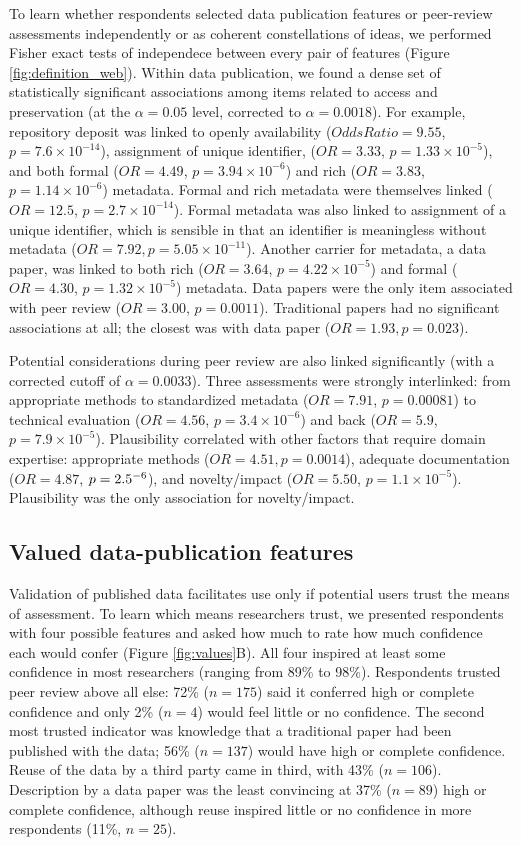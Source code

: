 \documentclass[10pt]{article}
\begin{document}
To learn whether respondents selected data publication features or peer-review assessments independently or as coherent constellations of ideas, we performed Fisher exact tests of independece between every pair of features (Figure \ref{fig:definition_web}).
Within data publication, we found a dense set of statistically significant associations among items related to access and preservation (at the $\alpha=0.05$ level, corrected to $\alpha=0.0018$).
For example, repository deposit was linked to openly availability ($Odds Ratio=9.55$, $p=7.6\times10^{-14}$), assignment of unique identifier, ($OR= 3.33$, $p= 1.33\times10^{-5}$), and both formal ($OR= 4.49$, $p= 3.94\times10^{-6}$) and rich ($OR= 3.83$, $p=1.14\times10^{-6}$) metadata.
Formal and rich metadata were themselves linked ($OR= 12.5$, $p=2.7\times10^{-14}$). 
Formal metadata was also linked to assignment of a unique identifier, which is sensible in that an identifier is meaningless without metadata ($OR= 7.92, p= 5.05\times10^{-11}$).
Another carrier for metadata, a data paper, was linked to both rich ($OR=3.64$, $p=4.22\times10^{-5}$) and formal ($OR=4.30$, $p=1.32\times10^{-5}$) metadata.
Data papers were the only item associated with peer review ($OR=3.00$, $p=0.0011$).
Traditional papers had no significant associations at all; the closest was with data paper ($OR=1.93, p=0.023$).

Potential considerations during peer review are also linked significantly (with a corrected cutoff of $\alpha=0.0033$).
Three assessments were strongly interlinked: from appropriate methods to standardized metadata ($OR=7.91$, $p=0.00081$) to technical evaluation ($OR=4.56$, $p=3.4\times10^{-6}$) and back ($OR=5.9$, $p=7.9\times10^{-5}$).
Plausibility correlated with other factors that require domain expertise: appropriate methods ($OR=4.51, p=0.0014$), adequate documentation ($OR=4.87$, $p=2.5\time10^{-6}$), and novelty/impact ($OR=5.50$, $p=1.1\times10^{-5}$).
Plausibility was the only association for novelty/impact.

\subsection*{Valued data-publication features}

Validation of published data facilitates use only if potential users trust the means of assessment.
To learn which means researchers trust, we presented respondents with four possible features and asked how much to rate how much confidence each would confer (Figure \ref{fig:values}B).
All four inspired at least some confidence in most researchers (ranging from 89\% to 98\%).
Respondents trusted peer review above all else: 72\% ($n=175$) said it conferred high or complete confidence and only 2\% ($n=4$) would feel little or no confidence.
The second most trusted indicator was knowledge that a traditional paper had been published with the data; 56\% ($n=137$) would have high or complete confidence.
Reuse of the data by a third party came in third, with 43\% ($n=106$). 
Description by a data paper was the least convincing at 37\% ($n=89$) high or complete confidence, although reuse inspired little or no confidence in more respondents (11\%, $n=25$).
\end{document}
